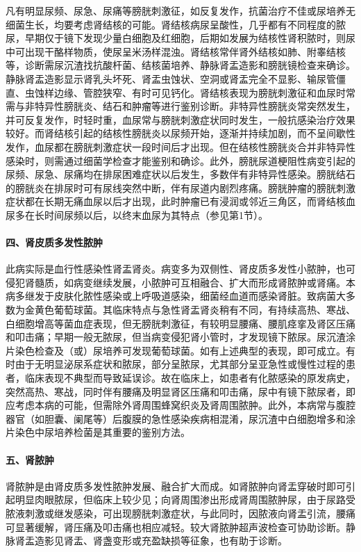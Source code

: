 凡有明显尿频、尿急、尿痛等膀胱刺激征，如反复发作，抗菌治疗不佳或尿培养无细菌生长，均要考虑肾结核的可能。肾结核病尿呈酸性，几乎都有不同程度的脓尿，早期仅于镜下发现少量白细胞及红细胞，后期如发展为结核性肾积脓时，则尿中可出现干酪样物质，使尿呈米汤样混浊。肾结核常伴肾外结核如肺、附睾结核等，诊断需尿沉渣找抗酸杆菌、结核菌培养、静脉肾盂造影和膀胱镜检查来确诊。静脉肾盂造影显示肾乳头坏死、肾盂虫蚀状、空洞或肾盂完全不显影、输尿管僵直、虫蚀样边缘、管腔狭窄、有时可见钙化。肾结核表现为膀胱刺激征和血尿时常需与非特异性膀胱炎、结石和肿瘤等进行鉴别诊断。非特异性膀胱炎常突然发生，并可反复发作，时轻时重，血尿常与膀胱刺激症状同时发生，一般抗感染治疗效果较好。而肾结核引起的结核性膀胱炎以尿频开始，逐渐并持续加剧，而不呈间歇性发作，血尿都在膀胱刺激症状一段时间后才出现。但在结核性膀胱炎合并非特异性感染时，则需通过细菌学检查才能鉴别和确诊。此外，膀胱尿道梗阻性病变引起的尿频、尿急、尿痛均在排尿困难症状以后发生，多数伴有非特异性感染。膀胱结石的膀胱炎在排尿时可有尿线突然中断，伴有尿道内剧烈疼痛。膀胱肿瘤的膀胱刺激症状都在长期无痛血尿以后才出现，此时肿瘤已有浸润或邻近三角区，而肾结核血尿多在长时间尿频以后，以终末血尿为其特点（参见第1节）。

\paragraph{四、肾皮质多发性脓肿}

此病实际是血行性感染性肾盂肾炎。病变多为双侧性、肾皮质多发性小脓肿，也可侵犯肾髓质，如病变继续发展，小脓肿可互相融合、扩大而形成肾脓肿或肾痛。本病多继发于皮肤化脓性感染或上呼吸道感染，细菌经血道而感染肾脏。致病菌大多数为金黄色葡萄球菌。其临床特点与急性肾盂肾炎稍有不同，有持续高热、寒战、白细胞增高等菌血症表现，但无膀胱刺激征，有较明显腰痛、腰肌痉挛及肾区压痛和叩击痛；早期一般无脓尿，但当病变侵犯肾小管时，才发现镜下脓尿。尿沉渣涂片染色检查及（或）尿培养可发现葡萄球菌。如有上述典型的表现，即可成立。有时由于无明显泌尿系症状和脓尿，部分呈脓尿，尤其部分呈亚急性或慢性过程的患者，临床表现不典型而导致延误诊。故在临床上，如患者有化脓感染的原发病史，突然高热、寒战，同时伴有腰痛及明显肾区压痛和叩击痛，尿中有镜下脓尿者，即应考虑本病的可能，但需除外肾周围蜂窝织炎及肾周围脓肿。此外，本病常与腹腔器官（如胆囊、阑尾等）后腹膜的急性感染疾病相混淆，尿沉渣中白细胞增多和涂片染色中尿培养检菌是其重要的鉴别方法。

\paragraph{五、肾脓肿}

肾脓肿是由肾皮质多发性脓肿发展、融合扩大而成。如肾脓肿向肾盂穿破时即可引起明显肉眼脓尿，但临床上较少见；向肾周围渗出形成肾周围脓肿尿，由于尿路受脓液刺激或继发感染，可出现膀胱刺激症状，与此同时，因脓液向肾盂引流，腰痛可显著缓解，肾压痛及叩击痛也相应减轻。较大肾脓肿超声波检查可协助诊断。静脉肾盂造影见肾盂、肾盏变形或充盈缺损等征象，也有助于诊断。

